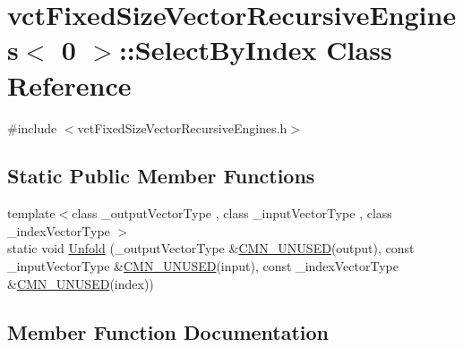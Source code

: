 \hypertarget{classvct_fixed_size_vector_recursive_engines_3_010_01_4_1_1_select_by_index}{}\section{vct\+Fixed\+Size\+Vector\+Recursive\+Engines$<$ 0 $>$\+:\+:Select\+By\+Index Class Reference}
\label{classvct_fixed_size_vector_recursive_engines_3_010_01_4_1_1_select_by_index}


{\ttfamily \#include $<$vct\+Fixed\+Size\+Vector\+Recursive\+Engines.\+h$>$}

\subsection*{Static Public Member Functions}
\begin{DoxyCompactItemize}
\item 
{\footnotesize template$<$class \+\_\+output\+Vector\+Type , class \+\_\+input\+Vector\+Type , class \+\_\+index\+Vector\+Type $>$ }\\static void \hyperlink{classvct_fixed_size_vector_recursive_engines_3_010_01_4_1_1_select_by_index_af31a0a34314cd2395078f3fce335cdfa}{Unfold} (\+\_\+output\+Vector\+Type \&\hyperlink{cmn_portability_8h_a021894e2626935fa2305434b1e893ff6}{C\+M\+N\+\_\+\+U\+N\+U\+S\+E\+D}(output), const \+\_\+input\+Vector\+Type \&\hyperlink{cmn_portability_8h_a021894e2626935fa2305434b1e893ff6}{C\+M\+N\+\_\+\+U\+N\+U\+S\+E\+D}(input), const \+\_\+index\+Vector\+Type \&\hyperlink{cmn_portability_8h_a021894e2626935fa2305434b1e893ff6}{C\+M\+N\+\_\+\+U\+N\+U\+S\+E\+D}(index))
\end{DoxyCompactItemize}


\subsection{Member Function Documentation}
\hypertarget{classvct_fixed_size_vector_recursive_engines_3_010_01_4_1_1_select_by_index_af31a0a34314cd2395078f3fce335cdfa}{}
